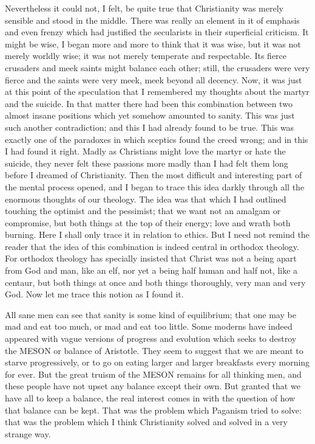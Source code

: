 Nevertheless it could not, I felt, be quite true that Christianity was merely sensible and stood in the middle. There was really an element in it of emphasis and even frenzy which had justified the secularists in their superficial criticism. It might be wise, I began more and more to think that it was wise, but it was not merely worldly wise; it was not merely temperate and respectable. Its fierce crusaders and meek saints might balance each other; still, the crusaders were very fierce and the saints were very meek, meek beyond all decency. Now, it was just at this point of the speculation that I remembered my thoughts about the martyr and the suicide. In that matter there had been this combination between two almost insane positions which yet somehow amounted to sanity. This was just such another contradiction; and this I had already found to be true. This was exactly one of the paradoxes in which sceptics found the creed wrong; and in this I had found it right. Madly as Christians might love the martyr or hate the suicide, they never felt these passions more madly than I had felt them long before I dreamed of Christianity. Then the most difficult and interesting part of the mental process opened, and I began to trace this idea darkly through all the enormous thoughts of our theology. The idea was that which I had outlined touching the optimist and the pessimist; that we want not an amalgam or compromise, but both things at the top of their energy; love and wrath both burning. Here I shall only trace it in relation to ethics. But I need not remind the reader that the idea of this combination is indeed central in orthodox theology. For orthodox theology has specially insisted that Christ was not a being apart from God and man, like an elf, nor yet a being half human and half not, like a centaur, but both things at once and both things thoroughly, very man and very God. Now let me trace this notion as I found it.

All sane men can see that sanity is some kind of equilibrium; that one may be mad and eat too much, or mad and eat too little. Some moderns have indeed appeared with vague versions of progress and evolution which seeks to destroy the MESON or balance of Aristotle. They seem to suggest that we are meant to starve progressively, or to go on eating larger and larger breakfasts every morning for ever. But the great truism of the MESON remains for all thinking men, and these people have not upset any balance except their own. But granted that we have all to keep a balance, the real interest comes in with the question of how that balance can be kept. That was the problem which Paganism tried to solve: that was the problem which I think Christianity solved and solved in a very strange way.

